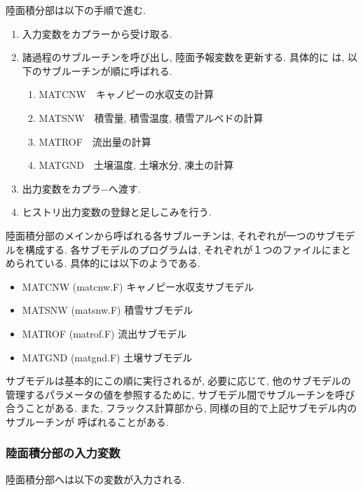陸面積分部は以下の手順で進む. 
\begin{enumerate}
 \item 入力変数をカプラーから受け取る. 
 \item 諸過程のサブルーチンを呼び出し, 陸面予報変数を更新する. 具体的に
       は, 以下のサブルーチンが順に呼ばれる. 
   \begin{enumerate}
    \item MATCNW\ \ キャノピーの水収支の計算
    \item MATSNW\ \ 積雪量, 積雪温度, 積雪アルベドの計算
    \item MATROF\ \ 流出量の計算
    \item MATGND\ \ 土壌温度, 土壌水分, 凍土の計算
   \end{enumerate}
 \item 出力変数をカプラ−へ渡す. 
 \item ヒストリ出力変数の登録と足しこみを行う. 
\end{enumerate}

陸面積分部のメインから呼ばれる各サブルーチンは, それぞれが一つのサブモデ
ルを構成する. 各サブモデルのプログラムは, それぞれが１つのファイルにまと
められている. 具体的には以下のようである. 

\begin{itemize}
 \item MATCNW (matcnw.F) キャノピー水収支サブモデル
 \item MATSNW (matsnw.F) 積雪サブモデル
 \item MATROF (matrof.F) 流出サブモデル
 \item MATGND (matgnd.F) 土壌サブモデル
\end{itemize}

サブモデルは基本的にこの順に実行されるが, 必要に応じて, 他のサブモデルの
管理するパラメータの値を参照するために, サブモデル間でサブルーチンを呼び
合うことがある. 
また, フラックス計算部から, 同様の目的で上記サブモデル内のサブルーチンが
呼ばれることがある. 

\subsubsection{陸面積分部の入力変数}

陸面積分部へは以下の変数が入力される. 


